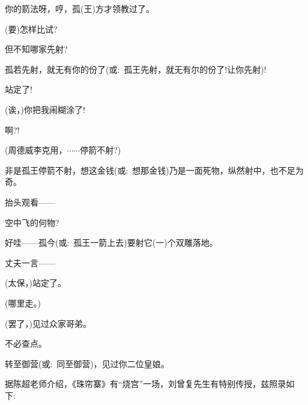 {你的箭法呀，哼，孤(王)方才领教过了。

(要)怎样比试?

但不知哪家先射?

孤若先射，就无有你的份了({\akai 或}:~孤王先射，就无有尔的份了!让你先射)!

站定了!\hspace{20pt}~



(诶，)你把我闹糊涂了!



啊?!\hspace{40pt}~


(周德威\hspace{20pt}李克用，$\cdots{}\cdots{}$停箭不射?)

非是孤王停箭不射，想这金钱({\akai 或}:~想那金钱)乃是一面死物，纵然射中，也不足为奇。

抬头观看------

空中飞的何物?

好哇------孤今({\akai 或}:~孤王一箭上去)要射它(一)个双雕落地。

丈夫一言------

(太保，)站定了。


(哪里走。)\hspace{10pt}~


(罢了，)见过众家哥弟。

不必查点。

转至御营({\akai 或}:~同至御营)，见过你二位皇娘。

}

\vspace{20pt}
{\hei 据陈超老师介绍，《珠帘寨》有``烧宫''一场，刘曾复先生有特别传授，兹照录如下:~}

